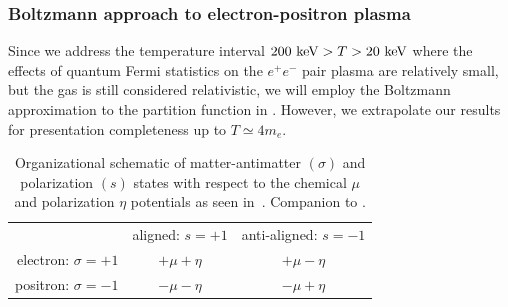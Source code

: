 \subsubsection{Boltzmann approach to electron-positron plasma}
\label{sec:boltzmann}
\noindent Since we address the temperature interval $200\text{ keV}>T>20\text{ keV}$ where the effects of quantum Fermi statistics on the $e^{+}e^{-}$ pair plasma are relatively small, but the gas is still considered relativistic, we will employ the Boltzmann approximation to the partition function in . However, we extrapolate our results for presentation completeness up to $T\simeq 4m_{e}$.

\begin{table}[ht]
 \centering
 \begin{tabular}{ r|c|c| }
 \multicolumn{1}{r}{}
 & \multicolumn{1}{c}{aligned: $s=+1$}
 & \multicolumn{1}{c}{anti-aligned: $s=-1$} \\
 \cline{2-3}
 electron: $\sigma=+1$ & $+\mu+\eta$ & $+\mu-\eta$ \TBstrut\\
 \cline{2-3}
 positron: $\sigma=-1$ & $-\mu-\eta$ & $-\mu+\eta$ \TBstrut\\
 \cline{2-3}
 \end{tabular}\\\,\Bstrut\\
 \caption{Organizational schematic of matter-antimatter $(\sigma)$ and polarization $(s)$ states with respect to the chemical $\mu$ and polarization $\eta$ potentials as seen in~. Companion to .}
 \label{fig:org}
\end{table}

